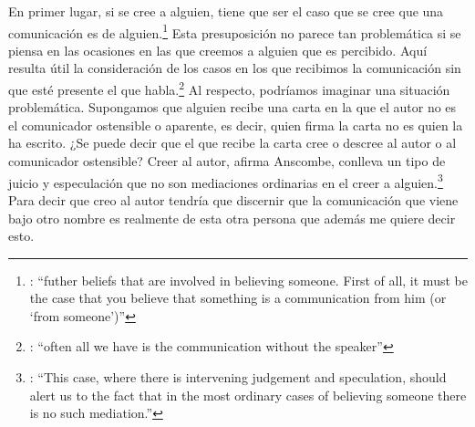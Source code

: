 En primer lugar, si se cree a alguien, tiene que ser el caso que se cree que una comunicación es de alguien.\footnote{\cite[Cf.~][6]{anscombe2008faith:tobelieve}: \enquote{futher beliefs that are involved in believing someone. First of all, it must be the case that you believe that something is a communication from him (or `from someone')}} Esta presuposición no parece tan problemática si se piensa en las ocasiones en las que creemos a alguien que es percibido. Aquí resulta útil la consideración de los casos en los que recibimos la comunicación sin que esté presente el que habla.\footnote{\cite[Cf.~][5]{anscombe2008faith:tobelieve}: \enquote{often all we have is the communication without the speaker}} Al respecto, podríamos imaginar una situación problemática. Supongamos que alguien recibe una carta en la que el autor no es el comunicador ostensible o aparente, es decir, quien firma la carta no es quien la ha escrito. ¿Se puede decir que el que recibe la carta cree o descree al autor o al comunicador ostensible? Creer al autor, afirma Anscombe, conlleva un tipo de juicio y especulación que no son mediaciones ordinarias en el creer a alguien.\footnote{\cite[Cf.~][7]{anscombe2008faith:tobelieve}: \enquote{This case, where there is intervening judgement and speculation, should alert us to the fact that in the most ordinary cases of believing someone there is no such mediation.}} Para decir que creo al autor tendría que discernir que la comunicación que viene bajo otro nombre es realmente de esta otra persona que además me quiere decir esto.

